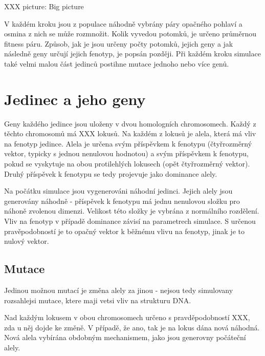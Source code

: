 XXX picture: Big picture



V každém kroku jsou z populace náhodně vybrány páry opačného pohlaví a osmina z nich se může rozmnožit.
Kolik vyvedou potomků, je určeno průměrnou fitness páru. Způsob, jak je jsou určeny počty potomků, jejich geny a
jak následně geny určují jejich fenotyp, je popsán později.
Při každém kroku simulace také velmi malou část jedinců postihne mutace jednoho nebo více genů.

\section{Jedinec a jeho geny}

Geny každého jedince jsou uloženy v dvou homologních chromosomech. Každý z těchto chromosomů má XXX lokusů.
Na každém z lokusů je alela, která má vliv na fenotyp jedince. Alela je určena svým příspěvkem k fenotypu (čtyřrozměrný
vektor, typicky s jednou nenulovou hodnotou) a svým příspěvkem k fenotypu, pokud se vyskytuje na obou protilehlých
lokusech (opět čtyřrozměrný vektor). Druhý příspěvek k fenotypu se tedy projevuje jako dominance alely.

Na počátku simulace jsou vygenerováni náhodní jedinci. Jejich alely jsou generovány náhodně - příspěvek k fenotypu
má jednu nenulovou složku pro náhoně zvolenou dimenzi. Velikost této složky je vybrána z normálního rozdělení. Vliv na
fenotyp v případě dominance závisí na parametrech simulace. S určenou pravěpodobností je to opačný vektor k běžnému
vlivu na fenotyp, jinak je to nulový vektor.

\subsection{Mutace}

Jedinou možnou mutací je změna alely za jinou - nejsou tedy simulovany rozsahlejsi mutace, ktere maji vetsi vliv na
strukturu DNA.

Nad každým lokusem v obou chromosomech určeno s pravděpodobností XXX, zda u něj dojde ke změně.
V případě, že ano, tak je na lokus dána nová náhodná. Nová alela vybírána obdobným mechanismem, jako jsou
generovny počáteční alely.

